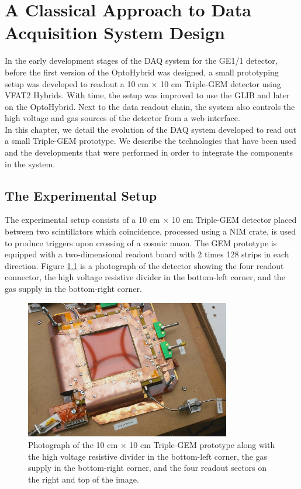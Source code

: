 \chapter{A Classical Approach to Data Acquisition System Design}
\label{chap:III-1-arch}

  In the early development stages of the DAQ system for the GE1/1 detector, before the first version of the OptoHybrid was designed, a small prototyping setup was developed to readout a 10 cm $ \times $ 10 cm Triple-GEM detector using VFAT2 Hybrids. With time, the setup was improved to use the GLIB and later on the OptoHybrid. Next to the data readout chain, the system also controls the high voltage and gas sources of the detector from a web interface. \\

  In this chapter, we detail the evolution of the DAQ system developed to read out a small Triple-GEM prototype. We describe the technologies that have been used and the developments that were performed in order to integrate the components in the system.

  \section{The Experimental Setup}

    The experimental setup consists of a 10 cm $ \times $ 10 cm Triple-GEM detector placed between two scintillators which coincidence, processed using a NIM crate, is used to produce triggers upon crossing of a cosmic muon. The GEM prototype is equipped with a two-dimensional readout board with 2 times 128 strips in each direction. Figure \ref{fig:III-1-gem} is a photograph of the detector showing the four readout connector, the high voltage resistive divider in the bottom-left corner, and the gas supply in the bottom-right corner. \\

    \begin{figure}[h!]
      \centering
      \includegraphics[width=0.8\textwidth]{img/III-1-arch/gem.png}
      \caption{Photograph of the 10 cm $ \times $ 10 cm Triple-GEM prototype along with the high voltage resistive divider in the bottom-left corner, the gas supply in the bottom-right corner, and the four readout sectors on the right and top of the image.}
      \label{fig:III-1-gem}
    \end{figure}

